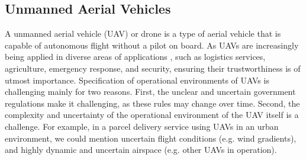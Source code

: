 \documentclass[sigconf]{acmart}
\begin{document}
%
%
%
%
%
%
%
%
%
%
%


\subsection{Unmanned Aerial Vehicles}
A unmanned aerial vehicle (UAV) or drone is a type of aerial vehicle that is capable of autonomous flight without a  pilot on board.
As UAVs are increasingly being applied in diverse areas of applications \cite{Ukaegbu2021}, such as logistics services, agriculture, emergency response, and security, ensuring their trustworthiness is of utmost importance.  
Specification of operational environments of UAVs is challenging mainly for two reasons. 
First, the unclear and uncertain government regulations make it challenging, as these rules may change over time. 
Second, the complexity and uncertainty of the operational environment of the UAV itself is a challenge. 
For example, in a parcel delivery service using UAVs in an urban environment, we could mention uncertain flight conditions (e.g. wind gradients), and highly dynamic and uncertain airspace (e.g. other UAVs in operation). 
\end{document}
